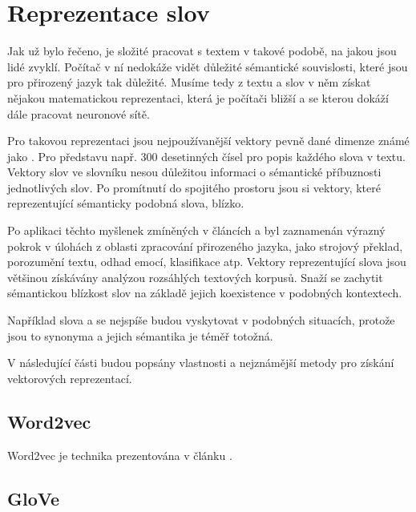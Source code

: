 \section{Reprezentace slov}
Jak už bylo řečeno, je složité pracovat s textem v takové podobě, na jakou jsou lidé zvyklí. Počítač v ní nedokáže vidět důležité sémantické souvislosti, které jsou pro přirozený jazyk tak důležité. Musíme tedy z textu a slov v něm získat nějakou matematickou reprezentaci, která je počítači bližší a se kterou dokáží dále pracovat neuronové sítě. \par
Pro takovou reprezentaci jsou nejpoužívanější vektory pevně dané dimenze známé jako . Pro představu např. 300 desetinných čísel pro popis každého slova v textu. Vektory slov ve slovníku nesou důležitou informaci o sémantické příbuznosti jednotlivých slov. Po promítnutí do spojitého prostoru jsou si vektory, které reprezentující sémanticky podobná slova, blízko.\par
Po aplikaci těchto myšlenek zmíněných v článcích \cite{mikolov2013embeddings} a \cite{mikolov2013_2} byl zaznamenán výrazný pokrok v úlohách z oblasti zpracování přirozeného jazyka, jako strojový překlad, porozumění textu, odhad emocí, klasifikace atp.
Vektory reprezentující slova jsou většinou získávány analýzou rozsáhlých textových korpusů. Snaží se zachytit sémantickou blízkost slov na základě jejich koexistence v podobných kontextech.\par 
Například slova  a  se nejspíše budou vyskytovat v podobných situacích, protože jsou to synonyma a jejich sémantika je téměř totožná.\par
V následující části budou popsány vlastnosti a nejznámější metody pro získání vektorových reprezentací.


\subsection{Word2vec}

Word2vec je technika prezentována v článku \cite{mikolov2013_2}.


\subsection{GloVe}

